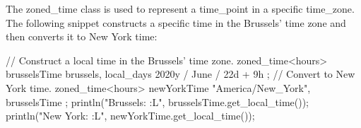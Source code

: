 The zoned\_time class is used to represent a time\_point in a specific time\_zone. The following snippet constructs a specific time in the Brussels’ time zone and then converts it to New York time:

\begin{cpp}
// Construct a local time in the Brussels' time zone.
zoned_time<hours> brusselsTime{ brussels, local_days { 2020y / June / 22d } + 9h };
// Convert to New York time.
zoned_time<hours> newYorkTime { "America/New_York", brusselsTime };
println("Brussels: {:L}", brusselsTime.get_local_time());
println("New York: {:L}", newYorkTime.get_local_time());
\end{cpp}










